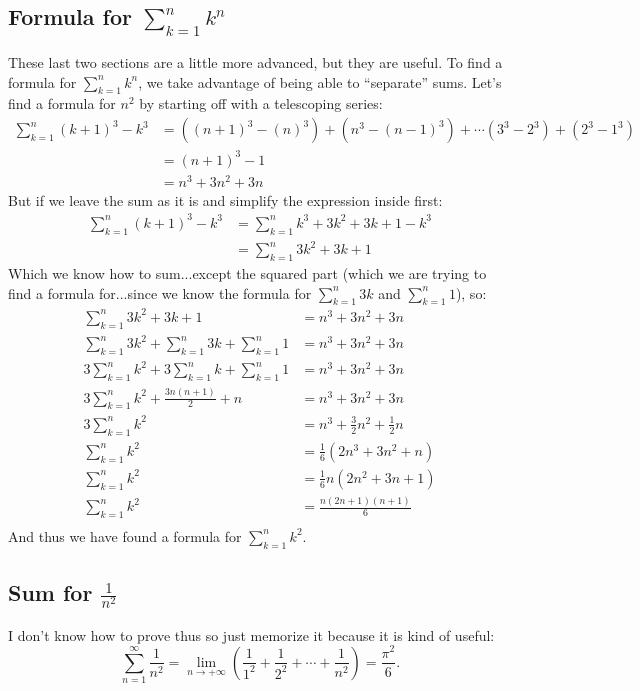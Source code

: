 	\subsection{Formula for \texorpdfstring{$\sum_{k=1}^n k^n$}{n\textasciicircum k}}
		These last two sections are a little more advanced, but they are useful.
		To find a formula for $\sum\limits_{k=1}^n k^n$, we take advantage of being able to ``separate'' sums. Let's find a formula for $n^2$ by starting off with a telescoping series:
		\begin{align*}
		\sum\limits_{k=1}^n (k+1)^3-k^3 &= ((n+1)^3 - (n)^3) + (n^{3} - (n-1)^3) +\cdots (3^3-2^3) + (2^3 - 1^3)  \\
		&= (n+1)^3 - 1 \\
		&= n^3 + 3n^2 + 3n
		\end{align*}
		But if we leave the sum as it is and simplify the expression inside first:
		\begin{align*}
		\sum\limits_{k=1}^n (k+1)^3-k^3 &= \sum\limits_{k=1}^n k^3+3k^2+3k+1-k^3 \\ 
		&= \sum\limits_{k=1}^n 3k^2+3k+1
		\end{align*}
		Which we know how to sum...except the squared part (which we are trying to find a formula for...since we know the formula for $\sum\limits_{k=1}^n 3k$ and $\sum\limits_{k=1}^n 1$), so:
		\begin{align*}
			\sum\limits_{k=1}^n 3k^2+3k+1 &=  n^3 + 3n^2 + 3n\\ 
			\sum\limits_{k=1}^n 3k^2 + \sum\limits_{k=1}^n 3k +\sum\limits_{k=1}^n 1 &= n^3 + 3n^2 + 3n\\
			3\sum\limits_{k=1}^n k^2 + 3\sum\limits_{k=1}^n k + \sum\limits_{k=1}^n 1 &= n^3 + 3n^2 + 3n\\
			3\sum\limits_{k=1}^n k^2 + \frac{3n(n+1)}{2} + n &= n^3 + 3n^2 + 3n\\
			3\sum\limits_{k=1}^n k^2 &= n^3 + \frac{3}{2}n^2 + \frac{1}{2}n \\ 
			\sum\limits_{k=1}^n k^2 &= \frac{1}{6}(2n^3 + 3n^2 + n) \\
			\sum\limits_{k=1}^n k^2 &= \frac{1}{6}n(2n^2 + 3n + 1) \\
			\sum\limits_{k=1}^n k^2 &= \frac{n(2n + 1)(n+1)}{6} \\
		\end{align*}
		And thus we have found a formula for $\sum\limits_{k=1}^n k^2 $. 

	\subsection{Sum for \texorpdfstring{$\frac{1}{n^2}$}{1/n\textasciicircum 2}}
		I don't know how to prove thus so just memorize it because it is kind of useful:
		$$ \sum_{n=1}^\infty \frac{1}{n^2} =
			\lim_{n \to +\infty}\left(\frac{1}{1^2} + \frac{1}{2^2} + \cdots + \frac{1}{n^2}\right) = 
			\frac{\pi^2}{6}.$$